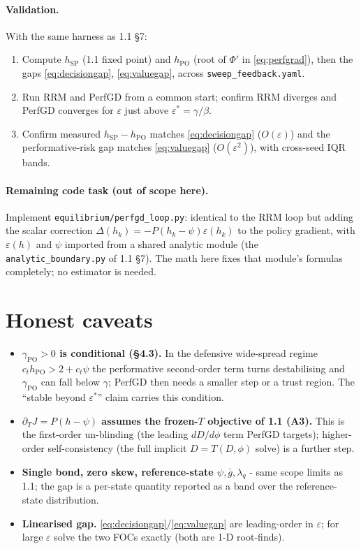\documentclass[11pt]{article}
\newcommand{\eps}{\varepsilon}
\newcommand{\gbar}{\bar g}
\newcommand{\code}[1]{\texttt{#1}}
\newcommand{\hSP}{h_{\mathrm{SP}}}
\newcommand{\hPO}{h_{\mathrm{PO}}}
\newcommand{\gPO}{\gamma_{\mathrm{PO}}}
\begin{document}
\paragraph{Validation.} With the same harness as 1.1 \S7:
\begin{enumerate}[leftmargin=*]
\item Compute $\hSP$ (1.1 fixed point) and $\hPO$ (root of $\Phi'$ in
  \eqref{eq:perfgrad}), then the gaps \eqref{eq:decisiongap}, \eqref{eq:valuegap},
  across \code{sweep\_feedback.yaml}.
\item Run RRM and PerfGD from a common start; confirm RRM diverges and PerfGD
  converges for $\eps$ just above $\eps^*=\gamma/\beta$.
\item Confirm measured $\hSP-\hPO$ matches \eqref{eq:decisiongap} ($O(\eps)$) and
  the performative-risk gap matches \eqref{eq:valuegap} ($O(\eps^2)$), with
  cross-seed IQR bands.
\end{enumerate}

\paragraph{Remaining code task (out of scope here).}
Implement \code{equilibrium/perfgd\_loop.py}: identical to the RRM loop but adding
the scalar correction $\Delta(h_k)=-P(h_k-\psi)\eps(h_k)$ to the policy gradient,
with $\eps(h)$ and $\psi$ imported from a shared analytic module (the
\code{analytic\_boundary.py} of 1.1 \S7). The math here fixes that module's
formulas completely; no estimator is needed.

\section{Honest caveats}

\begin{itemize}[leftmargin=*]
\item \textbf{$\gPO>0$ is conditional (\S4.3).} In the defensive wide-spread
  regime $c_t\hPO>2+c_t\psi$ the performative second-order term turns
  destabilising and $\gPO$ can fall below $\gamma$; PerfGD then needs a smaller
  step or a trust region. The ``stable beyond $\eps^*$'' claim carries this
  condition.
\item \textbf{$\partial_T J=P(h-\psi)$ assumes the frozen-$T$ objective of 1.1
  (A3).} This is the first-order un-blinding (the leading $dD/d\phi$ term PerfGD
  targets); higher-order self-consistency (the full implicit $D=T(D,\phi)$ solve)
  is a further step.
\item \textbf{Single bond, zero skew, reference-state $\psi,\gbar,\lambda_q$} -
  same scope limits as 1.1; the gap is a per-state quantity reported as a band
  over the reference-state distribution.
\item \textbf{Linearised gap.} \eqref{eq:decisiongap}/\eqref{eq:valuegap} are
  leading-order in $\eps$; for large $\eps$ solve the two FOCs exactly (both are
  1-D root-finds).
\end{itemize}
\end{document}
